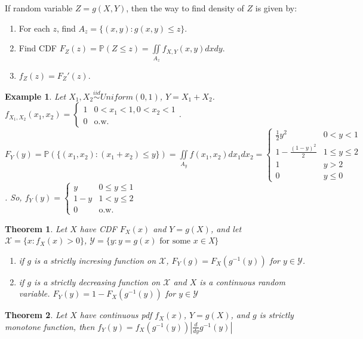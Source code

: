 \documentclass[11pt]{article}
\def\BP{{\bf P}}
\def\BP{{\mathbb P}}
\newtheorem{theorem}{Theorem}[section]
\newtheorem{example}{Example}[section]
\begin{document}
If random variable $Z = g(X, Y)$, then the way to find density of $Z$ is given by:
\begin{enumerate}
\item For each $z$, find $A_z = \{(x, y): g(x, y)\leq z\}$.
\item Find CDF $F_Z(z) = \BP(Z \leq z) = \iint\limits_{A_z} f_{X,Y}(x, y) dxdy$.
\item $f_Z(z) = F_Z'(z)$.
\end{enumerate}

\begin{example}
  Let $X_1, X_2 \stackrel{iid}{\sim} Uniform(0, 1)$, $Y = X_1 + X_2$. $f_{X_1, X_2}(x_1, x_2) = \begin{cases} 1 & 0<x_1 < 1, 0 < x_2 < 1 \\ 0 & \text{o.w.} \end{cases}$. $F_Y(y) = \BP(\{(x_1, x_2): (x_1 + x_2) \leq y \}) = \iint\limits_{A_y} f(x_1, x_2) dx_1dx_2 = \begin{cases}\frac{1}{2}y^2 & 0<y<1 \\
  1 - \frac{(1-y)^2}{2} & 1 \leq y \leq 2 \\ 1 & y > 2 \\ 0 & y \leq 0 \end{cases}$. So,
  $f_Y(y) = \begin{cases}y & 0\leq y \leq 1 \\ 1 - y & 1 < y \leq 2 \\ 0 & \text{o.w.} \end{cases}$
\end{example}

\begin{theorem}
Let $X$ have CDF $F_X(x)$ and $Y=g(X)$, and let $\mathcal{X} = \{x : f_X(x) > 0\}$, $\mathcal{Y} = \{y: y = g(x) \text{ for some }x \in $X$\}$
\begin{enumerate}
\item if $g$ is a strictly incresing function on $\mathcal{X}$, $F_Y(g) = F_X(g^{-1}(y))$ for $y \in \mathcal{Y}$.
\item if $g$ is a strictly decreasing function on $\mathcal{X}$ and $X$ is a continuous  random variable. $F_Y(y) = 1 - F_X(g^{-1}(y))$ for $y\in\mathcal{Y}$
\end{enumerate}
\end{theorem}

\begin{theorem}
Let $X$ have continuous pdf $f_X(x)$, $Y=g(X)$, and $g$ is strictly monotone function, then $f_Y(y) = f_X(g^{-1}(y)) |\frac{d}{dy}g^{-1}(y)| $ 
\end{theorem}
\end{document}
